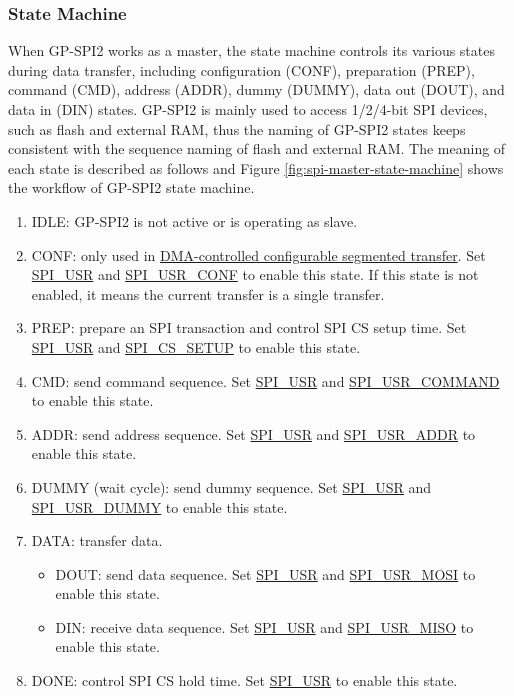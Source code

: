 \documentclass[main\_\_EN.tex]{subfiles}
\begin{document}
\subsubsection{State Machine}
\label{para:spi-state-machine}

When GP-SPI2 works as a master, the state machine controls its various states during data transfer, including configuration (CONF), preparation (PREP), command (CMD), address (ADDR), dummy (DUMMY), data out (DOUT), and data in (DIN) states. GP-SPI2 is mainly used to access 1/2/4-bit SPI devices, such as flash and external RAM, thus the naming of GP-SPI2 states keeps consistent with the sequence naming of flash and external RAM. The meaning of each state is described as follows and Figure \ref{fig:spi-master-state-machine} shows the workflow of GP-SPI2 state machine.

\begin{enumerate}
    \item IDLE: GP-SPI2 is not active or is operating as slave.
    \item CONF: only used in \hyperref[para:spi-dma-seg-conf-trans]{DMA-controlled configurable segmented transfer}. Set \hyperref[fielddesc:SPIUSR]{SPI\_USR} and \hyperref[fielddesc:SPIUSRCONF]{SPI\_USR\_CONF} to enable this state. If this state is not enabled, it means the current transfer is a single transfer.
    \item PREP: prepare an SPI transaction and control SPI CS setup time. Set \hyperref[fielddesc:SPIUSR]{SPI\_USR} and \hyperref[fielddesc:SPICSSETUP]{SPI\_CS\_SETUP} to enable this state.
    \item\label{phase:cmd} CMD: send command sequence. Set \hyperref[fielddesc:SPIUSR]{SPI\_USR} and \hyperref[fielddesc:SPIUSRCOMMAND]{SPI\_USR\_COMMAND} to enable this state.
    \item\label{phase:addr} ADDR: send address sequence. Set \hyperref[fielddesc:SPIUSR]{SPI\_USR} and \hyperref[fielddesc:SPIUSRADDR]{SPI\_USR\_ADDR} to enable this state.
    \item DUMMY (wait cycle): send dummy sequence. Set \hyperref[fielddesc:SPIUSR]{SPI\_USR} and \hyperref[fielddesc:SPIUSRDUMMY]{SPI\_USR\_DUMMY} to enable this state.
    \item\label{phase:data} DATA: transfer data.
    \begin{itemize}
    \item DOUT: send data sequence. Set \hyperref[fielddesc:SPIUSR]{SPI\_USR} and \hyperref[fielddesc:SPIUSRMOSI]{SPI\_USR\_MOSI} to enable this state.
    \item DIN: receive data sequence. Set \hyperref[fielddesc:SPIUSR]{SPI\_USR} and \hyperref[fielddesc:SPIUSRMISO]{SPI\_USR\_MISO} to enable this state.
    \end{itemize}
    \item DONE: control SPI CS hold time. Set \hyperref[fielddesc:SPIUSR]{SPI\_USR} to enable this state.
\end{enumerate}
\end{document}
